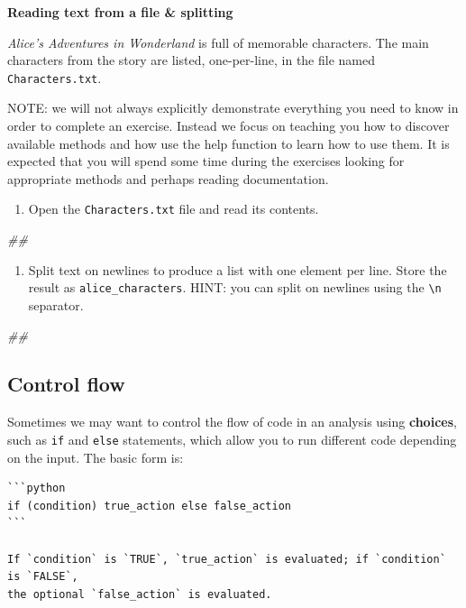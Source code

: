 \documentclass[]{book}
\newenvironment{Shaded}{\begin{snugshade}}{\end{snugshade}}
\newcommand{\CommentTok}[1]{\textcolor[rgb]{0.56,0.35,0.01}{\textit{#1}}}
\providecommand{\tightlist}{%
  \setlength{\itemsep}{0pt}\setlength{\parskip}{0pt}}
\begin{document}
\textbf{Reading text from a file \& splitting}

\emph{Alice's Adventures in Wonderland} is full of memorable characters.
The main characters from the story are listed, one-per-line, in the file
named \texttt{Characters.txt}.

NOTE: we will not always explicitly demonstrate everything you need to
know in order to complete an exercise. Instead we focus on teaching you
how to discover available methods and how use the help function to learn
how to use them. It is expected that you will spend some time during the
exercises looking for appropriate methods and perhaps reading
documentation.

\begin{enumerate}
\def\labelenumi{\arabic{enumi}.}
\tightlist
\item
  Open the \texttt{Characters.txt} file and read its contents.
\end{enumerate}

\begin{Shaded}
\begin{Highlighting}[]
\CommentTok{##}
\end{Highlighting}
\end{Shaded}

\begin{enumerate}
\def\labelenumi{\arabic{enumi}.}
\setcounter{enumi}{1}
\tightlist
\item
  Split text on newlines to produce a list with one element per line.
  Store the result as \texttt{alice\_characters}. HINT: you can split on
  newlines using the \texttt{\textbackslash{}n} separator.
\end{enumerate}

\begin{Shaded}
\begin{Highlighting}[]
\CommentTok{##}
\end{Highlighting}
\end{Shaded}

\subsection{Control flow}\label{control-flow-1}

Sometimes we may want to control the flow of code in an analysis using
\textbf{choices}, such as \texttt{if} and \texttt{else} statements,
which allow you to run different code depending on the input. The basic
form is:

\begin{verbatim}
```python
if (condition) true_action else false_action
```

If `condition` is `TRUE`, `true_action` is evaluated; if `condition` is `FALSE`,
the optional `false_action` is evaluated.
\end{verbatim}
\end{document}
